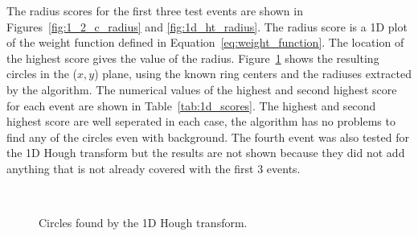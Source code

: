 \documentclass[11pt]{scrreprt}
\begin{document}
The radius scores for the first three test events are shown in Figures~\ref{fig:1_2_c_radius} and \ref{fig:1d_ht_radius}. The radius score is a 1D plot of the weight function defined in Equation~\ref{eq:weight_function}. The location of the highest score gives the value of the radius.
Figure~\ref{fig:1d_ht_results} shows the resulting circles in the ($x,y$) plane, using the known ring centers and the radiuses extracted by the algorithm. The numerical values of the highest and second highest score for each event are shown in Table~\ref{tab:1d_scores}. The highest and second highest score are well seperated in each case, the algorithm has no problems to find any of  the circles even with background. The fourth event was also tested for the 1D Hough transform but the results are not shown because they did not add anything that is not already covered with the first 3 events.

\begin{figure}[htp]
        \centering
        ~ %
                \label{fig:2c0bg}
        ~ %
                \label{fig:5c30bg}
        \caption{Circles found by the 1D Hough transform.}\label{fig:1d_ht_results}
\end{figure}
\end{document}
